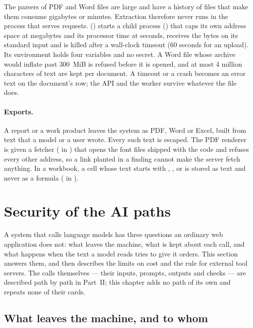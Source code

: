 The parsers of PDF and Word files are large and have a history of files that make them
consume gigabytes or minutes. Extraction therefore never runs in the process that serves
requests.  () starts a child process
() that caps its own address space at  \code{=} 
megabytes and its processor time at  \code{=}  seconds, receives the bytes on
its standard input and is killed after a wall-clock timeout (60 seconds for an upload). Its
environment holds four variables and no secret. A Word file whose archive would inflate past
300~MiB is refused before it is opened, and at most 4 million characters of text are kept per
document. A timeout or a crash becomes an error text on the document's row; the API and the
worker survive whatever the file does.

\paragraph{Exports.} A report or a work product leaves the system as PDF, Word or Excel, built
from text that a model or a user wrote. Every such text is escaped. The PDF renderer is given
a fetcher ( in ) that opens the font files shipped with
the code and refuses every other address, so a link planted in a finding cannot make the
server fetch anything. In a workbook, a cell whose text starts with \code{=}, \code{+},
\code{-} or  is stored as text and never as a formula ( in
).


\section{Security of the AI paths}\label{sec:security:ai}

A system that calls language models has three questions an ordinary web application does not:
what leaves the machine, what is kept about each call, and what happens when the text a model
reads tries to give it orders. This section answers them, and then describes the limits on
cost and the rule for external tool servers. The calls themselves --- their inputs, prompts,
outputs and checks --- are described path by path in Part~II; this chapter adds no path of its
own and repeats none of their cards.

\subsection{What leaves the machine, and to whom}\label{sec:security:ai:leaves}

